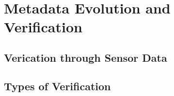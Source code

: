 












\chapter{Metadata Evolution and Verification}
\section{Verication through Sensor Data}

\section{Types of Verification}
